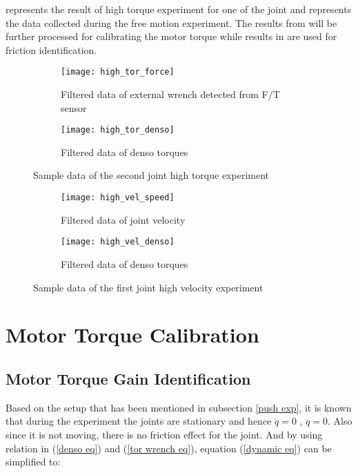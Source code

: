  represents the result of high torque experiment for one of the joint and  represents the data collected during the free motion experiment. The results from  will be further processed for calibrating the motor torque while results in  are used for friction identification.

\begin{figure}[H]
  \begin{subfigure}[t]{0.5\textwidth}
    \centering
    \texttt{[image: high\_tor\_force]} 
    \caption{Filtered data of external wrench detected from F/T sensor}
  \end{subfigure}
  \begin{subfigure}[t]{0.5\textwidth}
    \centering
    \texttt{[image: high\_tor\_denso]}
    \caption{Filtered data of denso torques}
  \end{subfigure}
  \caption{Sample data of the second joint high torque experiment}
  \label{fig: push result}
\end{figure}

\begin{figure}[H]
  \begin{subfigure}[t]{0.5\textwidth}
    \centering
    \texttt{[image: high\_vel\_speed]} 
    \caption{Filtered data of joint velocity}
  \end{subfigure}
  \begin{subfigure}[t]{0.5\textwidth}
    \centering
    \texttt{[image: high\_vel\_denso]}
    \caption{Filtered data of denso torques}
  \end{subfigure}
  \caption{Sample data of the first joint high velocity experiment}
  \label{fig: fric result}
\end{figure}


\section{Motor Torque Calibration}
\subsection{Motor Torque Gain Identification}
Based on the setup that has been mentioned in subsection \ref{push exp}, it is known that during the experiment the joints are stationary and hence $\dot{q} = 0$ , $\ddot{q} = 0$. Also since it is not moving, there is no friction effect for the joint. And by using relation in (\ref{denso eq}) and (\ref{tor wrench eq}), equation (\ref{dynamic eq}) can be simplified to: 


